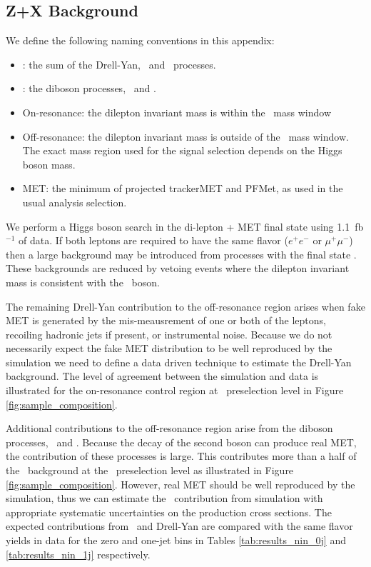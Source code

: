 \subsection{Z+X Background}

We define the following naming conventions in this appendix:

\begin{itemize}
    \item \zx: the sum of the Drell-Yan, \wz~and \zz~processes.
    \item \zv: the diboson processes, \wz~and \zz.
    \item On-resonance: the dilepton invariant mass is within the \z~mass window
    \item Off-resonance: the dilepton invariant mass is outside of the \z~mass window.
The exact mass region used for the signal selection depends on the Higgs boson mass.
    \item MET: the minimum of projected trackerMET and PFMet, as used in the usual analysis selection.
\end{itemize}

We perform a Higgs boson search in the di-lepton + MET final state using 1.1~fb$^{-1}$ of data.
If both leptons are required to have the same flavor ($e^{+}e^{-}$ or $\mu^{+}\mu^{-}$)
then a large background may be introduced from processes with the final state \zx.
These backgrounds are reduced by vetoing events where the dilepton invariant mass
is consistent with the \z~boson.

The remaining Drell-Yan contribution to the off-resonance region
arises when fake MET is generated by the mis-meausrement of 
one or both of the leptons, recoiling hadronic jets if present, or instrumental noise.
Because we do not necessarily expect the fake MET distribution to be well reproduced by the simulation
we need to define a data driven technique to estimate the Drell-Yan background.
The level of agreement between the simulation and data is illustrated for the on-resonance
control region at \ww~preselection level in Figure \ref{fig:sample_composition}.

Additional contributions to the off-resonance region arise from the diboson processes, \wz~and \zz.
Because the decay of the second boson can produce real MET, 
the contribution of these processes is large.
This contributes more than a half of the \zx~background at the \ww~preselection level as illustrated in Figure \ref{fig:sample_composition}.
However, real MET should be well reproduced by the simulation, thus we can estimate
the \zv~contribution from simulation with appropriate systematic uncertainties 
on the production cross sections.
The expected contributions from \zv~and Drell-Yan are compared with the same flavor
yields in data for the zero and one-jet bins in Tables \ref{tab:results_nin_0j} and \ref{tab:results_nin_1j} respectively.

